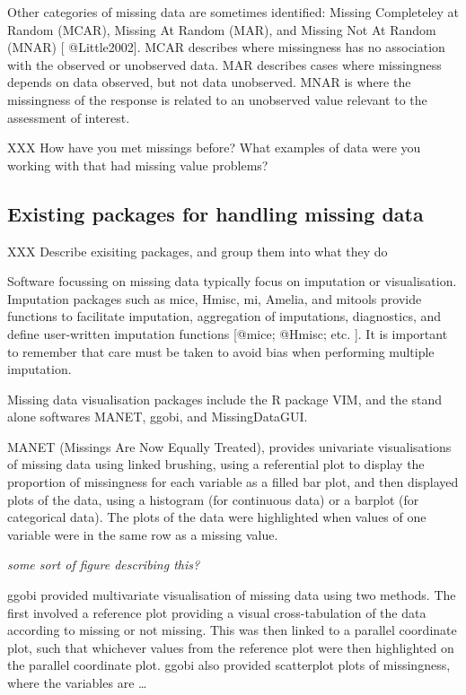 \documentclass[]{article}
\begin{document}
Other categories of missing data are sometimes identified: Missing
Completeley at Random (MCAR), Missing At Random (MAR), and Missing Not
At Random (MNAR) {[} @Little2002{]}. MCAR describes where missingness
has no association with the observed or unobserved data. MAR describes
cases where missingness depends on data observed, but not data
unobserved. MNAR is where the missingness of the response is related to
an unobserved value relevant to the assessment of interest.

XXX How have you met missings before? What examples of data were you
working with that had missing value problems?

\subsection{Existing packages for handling missing
data}\label{existing-packages-for-handling-missing-data}

XXX Describe exisiting packages, and group them into what they do

Software focussing on missing data typically focus on imputation or
visualisation. Imputation packages such as mice, Hmisc, mi, Amelia, and
mitools provide functions to facilitate imputation, aggregation of
imputations, diagnostics, and define user-written imputation functions
{[}@mice; @Hmisc; etc. {]}. It is important to remember that care must
be taken to avoid bias when performing multiple imputation.

Missing data visualisation packages include the R package VIM, and the
stand alone softwares MANET, ggobi, and MissingDataGUI.

MANET (Missings Are Now Equally Treated), provides univariate
visualisations of missing data using linked brushing, using a
referential plot to display the proportion of missingness for each
variable as a filled bar plot, and then displayed plots of the data,
using a histogram (for continuous data) or a barplot (for categorical
data). The plots of the data were highlighted when values of one
variable were in the same row as a missing value.

\emph{some sort of figure describing this?}

ggobi provided multivariate visualisation of missing data using two
methods. The first involved a reference plot providing a visual
cross-tabulation of the data according to missing or not missing. This
was then linked to a parallel coordinate plot, such that whichever
values from the reference plot were then highlighted on the parallel
coordinate plot. ggobi also provided scatterplot plots of missingness,
where the variables are \ldots{}
\end{document}
